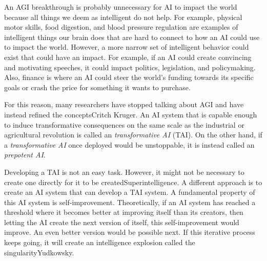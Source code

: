 \documentclass[12pt,A4]{report}
\newcommand{\autobaj}{}
\theoremstyle{definition}
\begin{document}


An AGI breakthrough is probably unnecessary for AI to impact the world because all things we deem as intelligent do not help. For example, physical motor skills, food digestion, and blood pressure regulation are examples of intelligent things our brain does that are hard to connect to how an AI could use to impact the world. However, a more narrow set of intelligent behavior could exist that could have an impact. For example, if an AI could create convincing and motivating speeches, it could impact politics, legislation, and policymaking. Also, finance is where an AI could steer the world's funding towards its specific goals or crash the price for something it wants to purchase. 

For this reason, many researchers have stopped talking about AGI and have instead refined the concepts\autobaj{Critch Kruger}. An AI system that is capable enough to induce transformative consequences on the same scale as the industrial or agricultural revolution is called an \textit{transformative AI} (TAI). On the other hand, if a \textit{transformative AI} once deployed would be unstoppable, it is instead called an \textit{prepotent AI}. 

Developing a TAI is not an easy task. However, it might not be necessary to create one directly for it to be created\autobaj{Superintelligence}. A different approach is to create an AI system that can develop a TAI system. A fundamental property of this AI system is self-improvement. Theoretically, if an AI system has reached a threshold where it becomes better at improving itself than its creators, then letting the AI create the next version of itself, this self-improvement would improve. An even better version would be possible next. If this iterative process keeps going, it will create an intelligence explosion called the singularity\autobaj{Yudkowsky}.  
\end{document}
